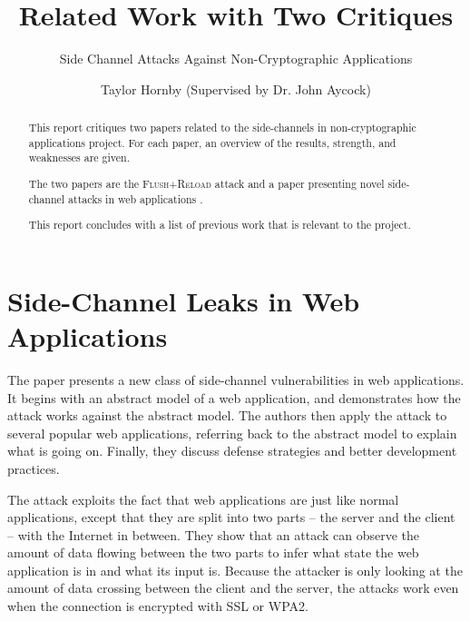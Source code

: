 \documentclass{acm_proc_article-sp}
\begin{document}
\sloppy

\title{Related Work with Two Critiques}
\subtitle{Side Channel Attacks Against Non-Cryptographic Applications}


\author{
\alignauthor
Taylor Hornby (Supervised by Dr. John Aycock)\\
}

\maketitle

\begin{abstract}
This report critiques two papers related to the side-channels in
non-cryptographic applications project. For each paper, an overview of the
results, strength, and weaknesses are given.

The two papers are the \textsc{Flush+Reload} attack \cite{yarom2013flush} and
a paper presenting novel side-channel attacks in web applications
\cite{chen2010side}.

This report concludes with a list of previous work that is relevant to the
project.
\end{abstract}

\section{Side-Channel Leaks in Web Applications}


The paper presents a new class of side-channel vulnerabilities in web
applications. It begins with an abstract model of a web application, and
demonstrates how the attack works against the abstract model. The authors then
apply the attack to several popular web applications, referring back to the
abstract model to explain what is going on. Finally, they discuss defense
strategies and better development practices.

The attack exploits the fact that web applications are just like normal
applications, except that they are split into two parts -- the server and the
client -- with the Internet in between. They show that an attack can observe the
amount of data flowing between the two parts to infer what state the web
application is in and what its input is. Because the attacker is only looking at
the amount of data crossing between the client and the server, the attacks work
even when the connection is encrypted with SSL or WPA2.
\end{document}
